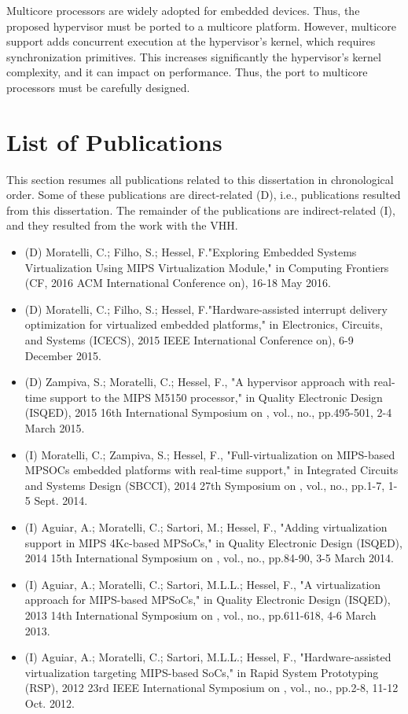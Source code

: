 Multicore processors are widely adopted for embedded devices. Thus, the proposed hypervisor must be ported to a multicore platform. However, multicore support adds concurrent execution at the hypervisor's kernel, which requires synchronization primitives. This increases significantly the hypervisor's kernel complexity, and it can impact on performance. Thus, the port to multicore processors must be carefully designed. 

\section{List of Publications}

This section resumes all publications related to this dissertation in chronological order. Some of these publications are direct-related (D), i.e., publications resulted from this dissertation. The remainder of the publications are indirect-related (I), and they resulted from the work with the VHH. 

\begin{itemize}
    \item (D) Moratelli, C.; Filho, S.; Hessel, F."Exploring Embedded Systems Virtualization Using MIPS Virtualization Module," in Computing Frontiers (CF, 2016 ACM International Conference on), 16-18 May 2016.
    \item (D) Moratelli, C.; Filho, S.; Hessel, F."Hardware-assisted interrupt delivery optimization for virtualized embedded platforms," in  Electronics, Circuits, and Systems (ICECS), 2015 IEEE International Conference on), 6-9 December 2015.
    \item (D) Zampiva, S.; Moratelli, C.; Hessel, F., "A hypervisor approach with real-time support to the MIPS M5150 processor," in Quality Electronic Design (ISQED), 2015 16th International Symposium on , vol., no., pp.495-501, 2-4 March 2015.
    \item (I) Moratelli, C.; Zampiva, S.; Hessel, F., "Full-virtualization on MIPS-based MPSOCs embedded platforms with real-time support," in Integrated Circuits and Systems Design (SBCCI), 2014 27th Symposium on , vol., no., pp.1-7, 1-5 Sept. 2014.
    \item (I) Aguiar, A.; Moratelli, C.; Sartori, M.; Hessel, F., "Adding virtualization support in MIPS 4Kc-based MPSoCs," in Quality Electronic Design (ISQED), 2014 15th International Symposium on , vol., no., pp.84-90, 3-5 March 2014.
    \item (I) Aguiar, A.; Moratelli, C.; Sartori, M.L.L.; Hessel, F., "A virtualization approach for MIPS-based MPSoCs," in Quality Electronic Design (ISQED), 2013 14th International Symposium on , vol., no., pp.611-618, 4-6 March 2013.
    \item (I) Aguiar, A.; Moratelli, C.; Sartori, M.L.L.; Hessel, F., "Hardware-assisted virtualization targeting MIPS-based SoCs," in Rapid System Prototyping (RSP), 2012 23rd IEEE International Symposium on , vol., no., pp.2-8, 11-12 Oct. 2012.
\end{itemize}
